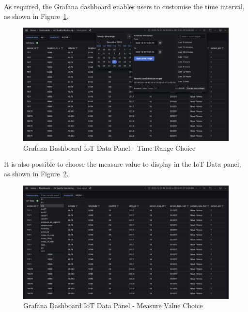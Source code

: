 \documentclass[12pt,oneside]{book} %
\begin{document}
As required, the Grafana dashboard enables users to customise the time
interval, as shown in Figure~\ref{fig:grafana-iot-data-panel-time-range}.
\begin{figure}[H]
    \centering
    \includegraphics[width=1\linewidth]{images/time-range.png}
    \caption{Grafana Dashboard IoT Data Panel - Time Range Choice}\label{fig:grafana-iot-data-panel-time-range}
\end{figure}

\newpage
It is also possible to choose the measure value to display in the IoT Data panel, as shown in Figure~\ref{fig:grafana-iot-data-panel-measure-value}.
\begin{figure}[H]
    \centering
    \includegraphics[width=1\linewidth]{images/measure-value.png}
    \caption{Grafana Dashboard IoT Data Panel - Measure Value Choice}\label{fig:grafana-iot-data-panel-measure-value}
\end{figure}
\end{document}
